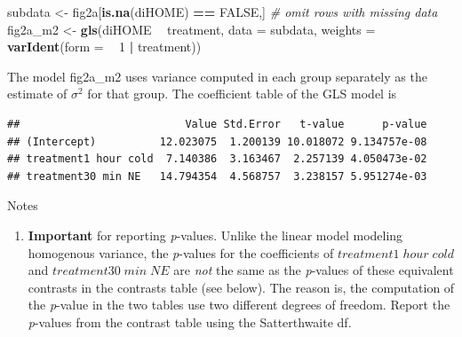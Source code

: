 \documentclass[]{book}
\newenvironment{Shaded}{\begin{snugshade}}{\end{snugshade}}
\newcommand{\CommentTok}[1]{\textcolor[rgb]{0.56,0.35,0.01}{\textit{#1}}}
\newcommand{\DataTypeTok}[1]{\textcolor[rgb]{0.13,0.29,0.53}{#1}}
\newcommand{\DecValTok}[1]{\textcolor[rgb]{0.00,0.00,0.81}{#1}}
\newcommand{\KeywordTok}[1]{\textcolor[rgb]{0.13,0.29,0.53}{\textbf{#1}}}
\newcommand{\NormalTok}[1]{#1}
\newcommand{\OperatorTok}[1]{\textcolor[rgb]{0.81,0.36,0.00}{\textbf{#1}}}
\newcommand{\OtherTok}[1]{\textcolor[rgb]{0.56,0.35,0.01}{#1}}
\newcommand{\StringTok}[1]{\textcolor[rgb]{0.31,0.60,0.02}{#1}}
\providecommand{\tightlist}{%
  \setlength{\itemsep}{0pt}\setlength{\parskip}{0pt}}
\begin{document}
\begin{Shaded}
\begin{Highlighting}[]
\NormalTok{subdata <-}\StringTok{ }\NormalTok{fig2a[}\KeywordTok{is.na}\NormalTok{(diHOME) }\OperatorTok{==}\StringTok{ }\OtherTok{FALSE}\NormalTok{,] }\CommentTok{# omit rows with missing data}
\NormalTok{fig2a_m2 <-}\StringTok{ }\KeywordTok{gls}\NormalTok{(diHOME }\OperatorTok{~}\StringTok{ }\NormalTok{treatment,}
                \DataTypeTok{data =}\NormalTok{ subdata,}
                \DataTypeTok{weights =} \KeywordTok{varIdent}\NormalTok{(}\DataTypeTok{form =} \OperatorTok{~}\StringTok{ }\DecValTok{1} \OperatorTok{|}\StringTok{ }\NormalTok{treatment))}
\end{Highlighting}
\end{Shaded}

The model fig2a\_m2 uses variance computed in each group separately as the estimate of \(\sigma^2\) for that group. The coefficient table of the GLS model is

\begin{Shaded}
\end{Shaded}

\begin{verbatim}
##                          Value Std.Error   t-value      p-value
## (Intercept)          12.023075  1.200139 10.018072 9.134757e-08
## treatment1 hour cold  7.140386  3.163467  2.257139 4.050473e-02
## treatment30 min NE   14.794354  4.568757  3.238157 5.951274e-03
\end{verbatim}

Notes

\begin{enumerate}
\def\labelenumi{\arabic{enumi}.}
\tightlist
\item
  \textbf{Important} for reporting \emph{p}-values. Unlike the linear model modeling homogenous variance, the \emph{p}-values for the coefficients of \(treatment1\;hour\;cold\) and \(treatment30\;min\;NE\) are \emph{not} the same as the \emph{p}-values of these equivalent contrasts in the contrasts table (see below). The reason is, the computation of the \emph{p}-value in the two tables use two different degrees of freedom. Report the \emph{p}-values from the contrast table using the Satterthwaite df.
\end{enumerate}
\end{document}
